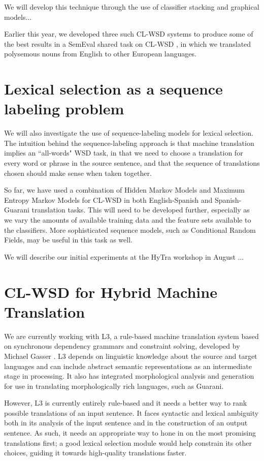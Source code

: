 \documentclass{article}
\begin{document}
We will develop this technique through the use of 
classifier stacking and graphical models...

Earlier this year, we developed three such CL-WSD systems
\cite{rudnick-liu-gasser:2013:SemEval-2013}
to produce some of the best results in a SemEval shared task
on CL-WSD \cite{task10}, in which we translated polysemous nouns from English
to other European languages.

\section{Lexical selection as a sequence labeling problem}
We will also investigate the use of 
sequence-labeling models for
lexical selection.
The intuition behind
the sequence-labeling approach is that machine translation implies an
``all-words" WSD task, in that we need to choose a translation for every word
or phrase in the source sentence, and that the sequence of translations chosen
should make sense when taken together.

So far, we have used a combination of Hidden Markov Models and Maximum Entropy
Markov Models for CL-WSD in both English-Spanish and Spanish-Guarani
translation tasks. This will need to be developed further, especially as we
vary the amounts of available training data and the feature sets available to
the classifiers. More sophisticated sequence models, such as Conditional Random
Fields, may be useful in this task as well.

We will describe our initial experiments at the HyTra workshop in August
\cite{rudnick-gasser:2013:HyTra-2013} ...

\section{CL-WSD for Hybrid Machine Translation}
We are currently working with L3, a rule-based machine translation system based
on synchronous dependency grammars and constraint solving, developed by Michael
Gasser . L3 depends on linguistic
knowledge about the source and target languages and can include abstract
semantic representations as an intermediate stage in processing. It also has
integrated morphological analysis and generation for use in translating
morphologically rich languages, such as Guarani.

However, L3 is currently entirely rule-based and it needs a better way to rank
possible translations of an input sentence. It faces syntactic and lexical
ambiguity both in its analysis of the input sentence and in the construction of
an output sentence. As such, it needs an appropriate way to hone in on the most
promising translations first; a good lexical selection module would help
constrain its other choices, guiding it towards high-quality translations
faster.
\end{document}
